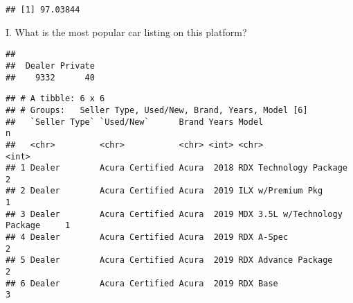 \documentclass[
]{article}
\newenvironment{Shaded}{\begin{snugshade}}{\end{snugshade}}
\newcommand{\FunctionTok}[1]{\textcolor[rgb]{0.00,0.00,0.00}{#1}}
\newcommand{\NormalTok}[1]{#1}
\newcommand{\OtherTok}[1]{\textcolor[rgb]{0.56,0.35,0.01}{#1}}
\newcommand{\SpecialCharTok}[1]{\textcolor[rgb]{0.00,0.00,0.00}{#1}}
\newcommand{\StringTok}[1]{\textcolor[rgb]{0.31,0.60,0.02}{#1}}
\begin{document}
\begin{verbatim}
## [1] 97.03844
\end{verbatim}

I. What is the most popular car listing on this platform?

\begin{Shaded}
\end{Shaded}

\begin{verbatim}
## 
##  Dealer Private 
##    9332      40
\end{verbatim}

\begin{Shaded}
\end{Shaded}

\begin{verbatim}
## # A tibble: 6 x 6
## # Groups:   Seller Type, Used/New, Brand, Years, Model [6]
##   `Seller Type` `Used/New`      Brand Years Model                             n
##   <chr>         <chr>           <chr> <int> <chr>                         <int>
## 1 Dealer        Acura Certified Acura  2018 RDX Technology Package            2
## 2 Dealer        Acura Certified Acura  2019 ILX w/Premium Pkg                 1
## 3 Dealer        Acura Certified Acura  2019 MDX 3.5L w/Technology Package     1
## 4 Dealer        Acura Certified Acura  2019 RDX A-Spec                        2
## 5 Dealer        Acura Certified Acura  2019 RDX Advance Package               2
## 6 Dealer        Acura Certified Acura  2019 RDX Base                          3
\end{verbatim}
\end{document}
